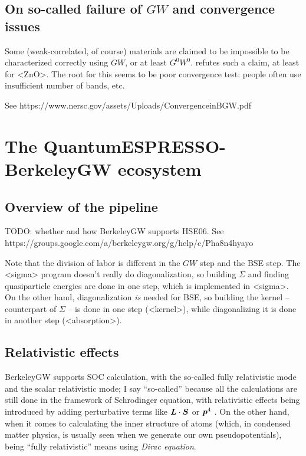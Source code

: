 \documentclass[hyperref, a4paper, 12pt]{report}
\def\ce#1{<#1>}%
\def\texttt#1{<#1>}%
\newcommand{\shortcode}[1]{\texttt{#1}}
\begin{document}
\section{On so-called failure of $GW$ and convergence issues}

Some (weak-correlated, of course) materials are claimed to be impossible 
to be characterized correctly using $GW$,
or at least $G^0 W^0$.
\cite{shih2010quasiparticle} refutes such a claim, 
at least for \ce{ZnO}.
The root for this seems to be poor convergence test:
people often use insufficient number of bands, etc.

See https://www.nersc.gov/assets/Uploads/ConvergenceinBGW.pdf

\chapter{The QuantumESPRESSO-BerkeleyGW ecosystem}

\section{Overview of the pipeline}

TODO: whether and how BerkeleyGW supports HSE06.
See https://groups.google.com/a/berkeleygw.org/g/help/c/Pha8n4hyayo

Note that the division of labor is different in the $GW$ step and the BSE step.
The \shortcode{sigma} program doesn't really do diagonalization,
so building $\Sigma$ and finding quasiparticle energies 
are done in one step, which is implemented in \shortcode{sigma}.
On the other hand, 
diagonalization \emph{is} needed for BSE,
so building the kernel -- counterpart of $\Sigma$ -- 
is done in one step (\shortcode{kernel}),
while diagonalizing it is done in another step (\shortcode{absorption}).

\section{Relativistic effects}

BerkeleyGW supports SOC calculation, 
with the so-called fully relativistic mode 
and the scalar relativistic mode;
I say ``so-called'' because all the calculations are still done 
in the framework of Schrodinger equation,
with relativistic effects being introduced by 
adding perturbative terms like $\vb*{L} \cdot \vb*{S}$ or $\vb*{p}^4$ \cite{barker2022spinor}.
On the other hand, when it comes to calculating the inner structure of atoms 
(which, in condensed matter physics,
is usually seen when we generate our own pseudopotentials),
being ``fully relativistic'' means using \emph{Dirac equation}.
\end{document}
